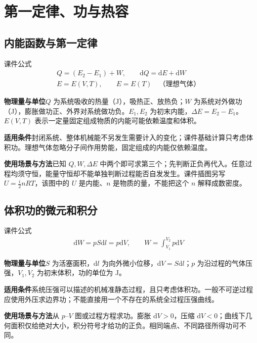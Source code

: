 \documentclass[UTF8,fontset=none,zihao=-4,a4paper]{ctexart}
\newcommand{\chapterpage}[1]{\clearpage\section{#1}}
\newcommand{\explain}[3]{\par\noindent\textbf{物理量与单位}\quad #1\par
\noindent\textbf{适用条件}\quad #2\par
\noindent\textbf{使用场景与方法}\quad #3\par}
\begin{document}
\chapterpage{第一定律、功与热容}
\par\noindent\begin{minipage}{\linewidth}
\subsection{内能函数与第一定律}
\begin{infobox}[breakable=false]{课件公式}
\begin{gather*}Q=(E_2-E_1)+W,\qquad\mathrm dQ=\mathrm dE+\mathrm dW\\E=E(V,T),\qquad E=E(T)\quad\text{（理想气体）}\end{gather*}
\end{infobox}
\end{minipage}\par
\explain{$Q$ 为系统吸收的热量（J），吸热正、放热负；$W$ 为系统对外做功（J），膨胀做功正、外界对系统做功负。$E_1,E_2$ 为初末内能，$\Delta E=E_2-E_1$。$E(V,T)$ 表示一定量固定组成物质的内能可能依赖温度和体积。}{封闭系统、整体机械能不另发生需要计入的变化；课件基础计算只考虑体积功。理想气体忽略分子间作用势能，固定组成的内能仅依赖温度。}{已知 $Q,W,\Delta E$ 中两个即可求第三个；先判断正负再代入。任意过程均须守恒，能量守恒却不能单独判断过程能否自发发生。课件插图另写 $U=\frac i2nRT$，该图中的 $U$ 是内能、$n$ 是物质的量，不能把这个 $n$ 解释成数密度。}


\par\noindent\begin{minipage}{\linewidth}
\subsection{体积功的微元和积分}
\begin{infobox}[breakable=false]{课件公式}
\begin{gather*}\mathrm dW=pS\mathrm dl=p\mathrm dV,\qquad W=\int_{V_1}^{V_2}p\mathrm dV\end{gather*}
\end{infobox}
\end{minipage}\par
\explain{$S$ 为活塞面积，$\mathrm dl$ 为向外微小位移，$\mathrm dV=S\mathrm dl$；$p$ 为沿过程的气体压强，$V_1,V_2$ 为初末体积，功的单位为 J。}{系统压强可以描述的机械准静态过程，且只考虑体积功。一般不可逆过程应使用外压求边界功；不能直接用一个不存在的系统全过程压强曲线。}{从 $p$--$V$ 图或过程方程求功。膨胀 $\mathrm dV>0$，压缩 $\mathrm dV<0$；曲线下几何面积仅给绝对大小，积分符号才给功的正负。相同端点、不同路径所得功可不同。}
\end{document}
